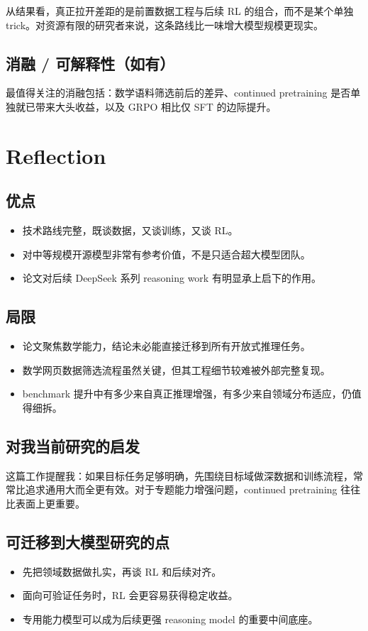 \documentclass[UTF8,fontset=fandol,zihao=-4]{ctexart}
\begin{document}
从结果看，真正拉开差距的是前置数据工程与后续 RL 的组合，而不是某个单独 trick。对资源有限的研究者来说，这条路线比一味增大模型规模更现实。

\subsection{消融 / 可解释性（如有）}
最值得关注的消融包括：数学语料筛选前后的差异、continued pretraining 是否单独就已带来大头收益，以及 GRPO 相比仅 SFT 的边际提升。

\section{Reflection}

\subsection{优点}
\begin{itemize}
  \item 技术路线完整，既谈数据，又谈训练，又谈 RL。
  \item 对中等规模开源模型非常有参考价值，不是只适合超大模型团队。
  \item 论文对后续 DeepSeek 系列 reasoning work 有明显承上启下的作用。
\end{itemize}

\subsection{局限}
\begin{itemize}
  \item 论文聚焦数学能力，结论未必能直接迁移到所有开放式推理任务。
  \item 数学网页数据筛选流程虽然关键，但其工程细节较难被外部完整复现。
  \item benchmark 提升中有多少来自真正推理增强，有多少来自领域分布适应，仍值得细拆。
\end{itemize}

\subsection{对我当前研究的启发}
这篇工作提醒我：如果目标任务足够明确，先围绕目标域做深数据和训练流程，常常比追求通用大而全更有效。对于专题能力增强问题，continued pretraining 往往比表面上更重要。

\subsection{可迁移到大模型研究的点}
\begin{itemize}
  \item 先把领域数据做扎实，再谈 RL 和后续对齐。
  \item 面向可验证任务时，RL 会更容易获得稳定收益。
  \item 专用能力模型可以成为后续更强 reasoning model 的重要中间底座。
\end{itemize}
\end{document}
